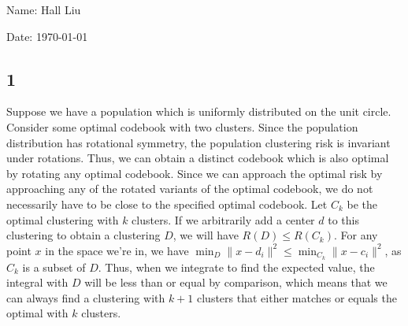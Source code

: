 \documentclass{article}
\begin{document}
Name: Hall Liu

Date: \today 
\vspace{1.5cm}
\subsection*{1}
Suppose we have a population which is uniformly distributed on the unit circle. Consider some optimal codebook with two clusters. Since the population distribution has rotational symmetry, the population clustering risk is invariant under rotations. Thus, we can obtain a distinct codebook which is also optimal by rotating any optimal codebook. Since we can approach the optimal risk by approaching any of the rotated variants of the optimal codebook, we do not necessarily have to be close to the specified optimal codebook.
Let $C_k$ be the optimal clustering with $k$ clusters. If we arbitrarily add a center $d$ to this clustering to obtain a clustering $D$, we will have $R(D)\leq R(C_k)$. For any point $x$ in the space we're in, we have $\min_D\|x-d_i\|^2\leq\min_{C_k}\|x-c_i\|^2$, as $C_k$ is a subset of $D$. Thus, when we integrate to find the expected value, the integral with $D$ will be less than or equal by comparison, which means that we can always find a clustering with $k+1$ clusters that either matches or equals the optimal with $k$ clusters.
\end{document}
